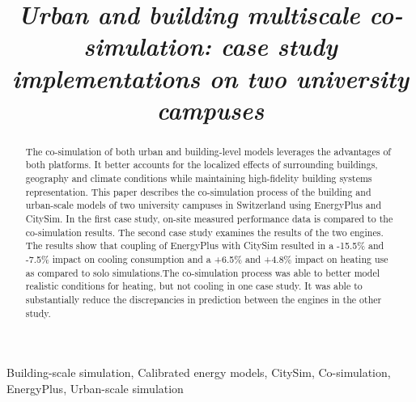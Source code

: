 \documentclass{tBPS2e}
\theoremstyle{plain}
\theoremstyle{definition}
\theoremstyle{remark}
\begin{document}


\title{\textit{Urban and building multiscale co-simulation: case study implementations on two university campuses}}


\maketitle

\begin{abstract}
The co-simulation of both urban and building-level models leverages the advantages of both platforms. 
It better accounts for the localized effects of surrounding buildings, geography and climate conditions 
while maintaining high-fidelity building systems representation. This paper describes the co-simulation process 
of the building and urban-scale models of two university campuses in Switzerland using EnergyPlus and CitySim. 
In the first case study, on-site measured performance data is compared to the co-simulation results. 
The second case study examines the results of the two engines. The results show that coupling of EnergyPlus with 
CitySim resulted in a -15.5\% and -7.5\% impact on cooling consumption and a +6.5\% and +4.8\% impact on heating 
use as compared to solo simulations.The co-simulation process was able to better model realistic conditions for 
heating, but not cooling in one case study. It was able to substantially reduce the discrepancies in prediction between the engines in the other study.
\end{abstract}

\begin{keywords}
Building-scale simulation, Calibrated energy models, CitySim, Co-simulation, EnergyPlus, Urban-scale simulation 
\end{keywords}
\end{document}
